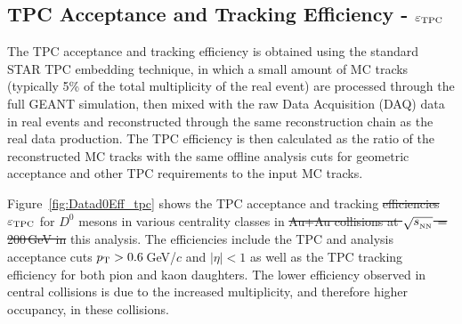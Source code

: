 \documentclass[%
 reprint,	
 amsmath,amssymb,
 aps,
 prc,
]{revtex4-1}
\providecommand{\DIFaddtex}[1]{{\protect\color{blue}\uwave{#1}}} %
\providecommand{\DIFdeltex}[1]{{\protect\color{red}\sout{#1}}}                      %
\providecommand{\DIFaddbegin}{} %
\providecommand{\DIFaddend}{} %
\providecommand{\DIFdelbegin}{} %
\providecommand{\DIFdelend}{} %
\providecommand{\DIFadd}[1]{\texorpdfstring{\DIFaddtex{#1}}{#1}} %
\providecommand{\DIFdel}[1]{\texorpdfstring{\DIFdeltex{#1}}{}} %
\begin{document}
\subsection{\DIFdelbegin %
\DIFdelend TPC Acceptance and Tracking Efficiency - $\varepsilon_{\rm TPC}$}
\DIFaddbegin \label{correction:tpc}
\DIFaddend 

The TPC acceptance and tracking efficiency is obtained using the standard STAR TPC embedding technique, in which a small amount of MC tracks (typically 5\% of the total multiplicity of the real event) are processed through the full GEANT simulation\DIFaddbegin \DIFadd{~\mbox{%
\cite{GEANT4}}%
}\DIFaddend , then mixed with the raw Data Acquisition (DAQ) data in real events and reconstructed through the same reconstruction chain as the real data production. The TPC efficiency is then calculated as the ratio of the reconstructed MC tracks with the same offline analysis cuts for geometric acceptance and other TPC requirements to the input MC tracks.

Figure~\ref{fig:Datad0Eff_tpc} shows the TPC acceptance and tracking \DIFdelbegin \DIFdel{efficiencies }\DIFdelend \DIFaddbegin \DIFadd{efficiency }\DIFaddend $\varepsilon_{\rm TPC}$ for $D^0$ mesons in various centrality classes in \DIFdelbegin \DIFdel{Au+Au collisions at $\sqrt{s_{_{\rm NN}}}$ = 200\,GeV in }\DIFdelend this analysis. The efficiencies include the TPC and analysis acceptance cuts \DIFdelbegin \DIFdel{$p_{\rm T}>0.6$}\DIFdelend \DIFaddbegin \DIFadd{$p_{T}>0.6$}\DIFaddend \,GeV/$c$ and $|\eta|<1$ as well as the TPC tracking efficiency for both pion and kaon daughters. The lower efficiency observed in central collisions is due to the increased multiplicity, and therefore higher occupancy, in these collisions.
\end{document}
